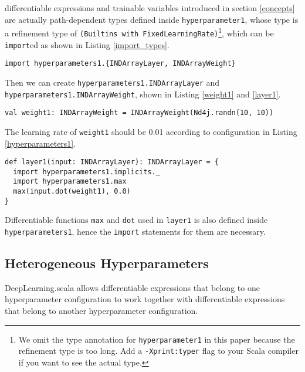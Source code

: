 \Glspl{differentiable expression} and \glspl{trainable variable} introduced in section \ref{concepts} are actually path-dependent types \cite{amin2014foundations} defined inside \lstinline{hyperparameter1}, whose type is a refinement type of \lstinline{(Builtins with FixedLearningRate)}\footnote{We omit the type annotation for \lstinline{hyperparameter1} in this paper because the refinement type is too long. Add a \lstinline{-Xprint:typer} flag to your Scala compiler if you want to see the actual type.}, which can be \lstinline{import}ed as shown in Listing \ref{import_types}.

\begin{lstlisting}[float={htbp},caption={Importing \Glspl{differentiable expression} and \glspl{trainable variable} types}, label={import_types}]
import hyperparameters1.{INDArrayLayer, INDArrayWeight}
\end{lstlisting}

Then we can create \lstinline{hyperparameters1.INDArrayLayer} and \lstinline{hyperparameters1.INDArrayWeight}, shown in Listing \ref{weight1} and \ref{layer1}.

\begin{lstlisting}[float={htbp},caption={\Glspl{trainable variable} that belong to \lstinline{hyperparameter1}}, label={weight1}]
val weight1: INDArrayWeight = INDArrayWeight(Nd4j.randn(10, 10))
\end{lstlisting}

The learning rate of \lstinline{weight1} should be 0.01 according to configuration in Listing \ref{hyperparameters1}.

\begin{lstlisting}[float={htbp},caption={\Glspl{differentiable expression} that belong to \lstinline{hyperparameter1}}, label={layer1}]
def layer1(input: INDArrayLayer): INDArrayLayer = {
  import hyperparameters1.implicits._
  import hyperparameters1.max
  max(input.dot(weight1), 0.0)
}
\end{lstlisting}

Differentiable functions \lstinline{max} and \lstinline{dot} used in \lstinline{layer1} is also defined inside \lstinline{hyperparameters1}, hence the \lstinline{import} statements for them are necessary.

\subsection{Heterogeneous Hyperparameters}

DeepLearning.scala allows \glspl{differentiable expression} that belong to one hyperparameter configuration to work together with \glspl{differentiable expression} that belong to another hyperparameter configuration. 

